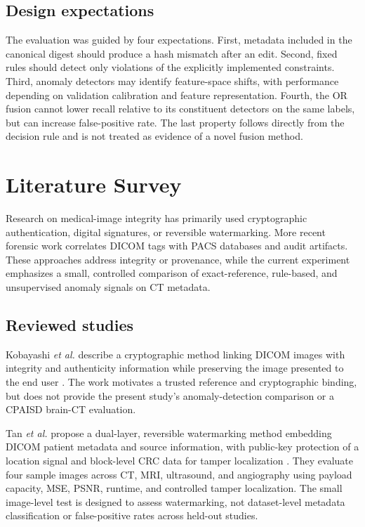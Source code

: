 \documentclass[journal]{IEEEtran}
\begin{document}
  \subsection{Design expectations}
  The evaluation was guided by four expectations. First, metadata included in the canonical digest should produce a hash mismatch after an edit. Second, fixed rules should detect only violations of the explicitly implemented constraints. Third, anomaly detectors may identify feature-space shifts, with performance depending on validation calibration and feature representation. Fourth, the OR fusion cannot lower recall relative to its constituent detectors on the same labels, but can increase false-positive rate. The last property follows directly from the decision rule and is not treated as evidence of a novel fusion method.
  
  \section{Literature Survey}
  Research on medical-image integrity has primarily used cryptographic authentication, digital signatures, or reversible watermarking. More recent forensic work correlates DICOM tags with PACS databases and audit artifacts. These approaches address integrity or provenance, while the current experiment emphasizes a small, controlled comparison of exact-reference, rule-based, and unsupervised anomaly signals on CT metadata.
  
  \subsection{Reviewed studies}
  Kobayashi \emph{et al.} describe a cryptographic method linking DICOM images with integrity and authenticity information while preserving the image presented to the end user \cite{kobayashi2009}. The work motivates a trusted reference and cryptographic binding, but does not provide the present study's anomaly-detection comparison or a CPAISD brain-CT evaluation.
  
  Tan \emph{et al.} propose a dual-layer, reversible watermarking method embedding DICOM patient metadata and source information, with public-key protection of a location signal and block-level CRC data for tamper localization \cite{tan2011}. They evaluate four sample images across CT, MRI, ultrasound, and angiography using payload capacity, MSE, PSNR, runtime, and controlled tamper localization. The small image-level test is designed to assess watermarking, not dataset-level metadata classification or false-positive rates across held-out studies.
  
\end{document}
